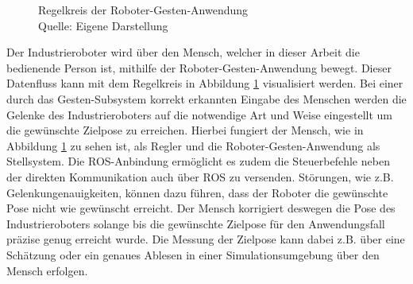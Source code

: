 \begin{figure}[!h]
\newline
    \caption[Regelkreis der Roboter-Gesten-Anwendung]{Regelkreis der Roboter-Gesten-Anwendung\\Quelle: Eigene Darstellung}
    \label{fig:regelkreis_tir}
\end{figure}\FloatBarrier

Der Industrieroboter wird über den Mensch, welcher in dieser Arbeit die bedienende Person ist, mithilfe der Roboter-Gesten-Anwendung bewegt. Dieser Datenfluss kann mit dem Regelkreis in Abbildung \ref{fig:regelkreis_tir} visualisiert werden. Bei einer durch das Gesten-Subsystem korrekt erkannten Eingabe des Menschen werden die Gelenke des Industrieroboters auf die notwendige Art und Weise eingestellt um die gewünschte Zielpose zu erreichen. Hierbei fungiert der Mensch, wie in Abbildung \ref{fig:regelkreis_tir} zu sehen ist, als Regler und die Roboter-Gesten-Anwendung als Stellsystem. Die ROS-Anbindung ermöglicht es zudem die Steuerbefehle neben der direkten Kommunikation auch über ROS zu versenden. Störungen, wie z.B. Gelenkungenauigkeiten, können dazu führen, dass der Roboter die gewünschte Pose nicht wie gewünscht erreicht. Der Mensch korrigiert deswegen die Pose des Industrieroboters solange bis die gewünschte Zielpose für den Anwendungsfall präzise genug erreicht wurde. Die Messung der Zielpose kann dabei z.B. über eine Schätzung oder ein genaues Ablesen in einer Simulationsumgebung über den Mensch erfolgen.


